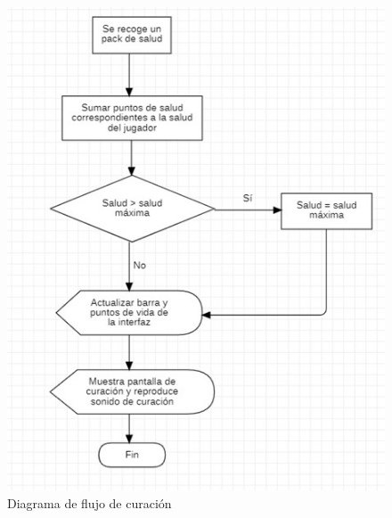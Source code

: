 \begin{figure}[h]
    \centering
    \includegraphics[scale=0.5]{img/HealingFlowchart.jpg}
    \caption{Diagrama de flujo de curación}
    \label{fig:DiagramaCuracion}
    \end{figure}
    

